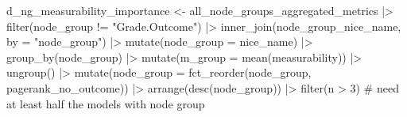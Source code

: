 \documentclass[
  letterpaper,
  DIV=11,
  numbers=noendperiod]{scrartcl}
\newenvironment{Shaded}{\begin{snugshade}}{\end{snugshade}}
\newcommand{\AttributeTok}[1]{\textcolor[rgb]{0.40,0.45,0.13}{#1}}
\newcommand{\CommentTok}[1]{\textcolor[rgb]{0.37,0.37,0.37}{#1}}
\newcommand{\DecValTok}[1]{\textcolor[rgb]{0.68,0.00,0.00}{#1}}
\newcommand{\FunctionTok}[1]{\textcolor[rgb]{0.28,0.35,0.67}{#1}}
\newcommand{\NormalTok}[1]{\textcolor[rgb]{0.00,0.23,0.31}{#1}}
\newcommand{\OtherTok}[1]{\textcolor[rgb]{0.00,0.23,0.31}{#1}}
\newcommand{\SpecialCharTok}[1]{\textcolor[rgb]{0.37,0.37,0.37}{#1}}
\newcommand{\StringTok}[1]{\textcolor[rgb]{0.13,0.47,0.30}{#1}}
\begin{document}
\begin{Shaded}
\begin{Highlighting}[]
\NormalTok{d\_ng\_measurability\_importance }\OtherTok{\textless{}{-}} 
\NormalTok{    all\_node\_groups\_aggregated\_metrics }\SpecialCharTok{|\textgreater{}} 
    \FunctionTok{filter}\NormalTok{(node\_group }\SpecialCharTok{!=} \StringTok{"Grade.Outcome"}\NormalTok{) }\SpecialCharTok{|\textgreater{}}
    \FunctionTok{inner\_join}\NormalTok{(node\_group\_nice\_name, }\AttributeTok{by =} \StringTok{"node\_group"}\NormalTok{) }\SpecialCharTok{|\textgreater{}}
    \FunctionTok{mutate}\NormalTok{(}\AttributeTok{node\_group =}\NormalTok{ nice\_name) }\SpecialCharTok{|\textgreater{}}
    \FunctionTok{group\_by}\NormalTok{(node\_group) }\SpecialCharTok{|\textgreater{}}
    \FunctionTok{mutate}\NormalTok{(}\AttributeTok{m\_group =} \FunctionTok{mean}\NormalTok{(measurability)) }\SpecialCharTok{|\textgreater{}}
    \FunctionTok{ungroup}\NormalTok{() }\SpecialCharTok{|\textgreater{}} 
    \FunctionTok{mutate}\NormalTok{(}\AttributeTok{node\_group =} \FunctionTok{fct\_reorder}\NormalTok{(node\_group, pagerank\_no\_outcome)) }\SpecialCharTok{|\textgreater{}} 
    \FunctionTok{arrange}\NormalTok{(}\FunctionTok{desc}\NormalTok{(node\_group)) }\SpecialCharTok{|\textgreater{}} 
    \FunctionTok{filter}\NormalTok{(n }\SpecialCharTok{\textgreater{}} \DecValTok{3}\NormalTok{) }\CommentTok{\# need at least half the models with node group}



\end{Highlighting}
\end{Shaded}
\end{document}
